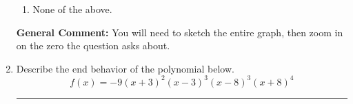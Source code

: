 \documentclass{extbook}[14pt]
\newcommand{\litem}[1]{\item #1

\rule{\textwidth}{0.4pt}}
\begin{document}
\begin{enumerate}
{\begin{enumerate}[label=\Alph*.]
\item None of the above.\end{enumerate}
\textbf{General Comment:} You will need to sketch the entire graph, then zoom in on the zero the question asks about.
}
\litem{
Describe the end behavior of the polynomial below.
\[ f(x) = -9(x + 3)^{2}(x - 3)^{3}(x - 8)^{3}(x + 8)^{4} \]

}
\end{enumerate}
\end{document}
